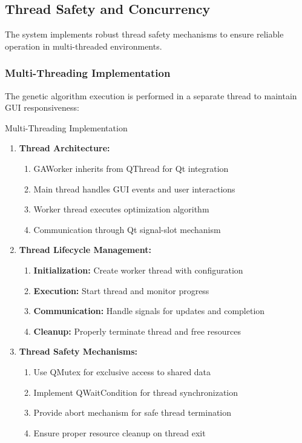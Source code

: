 \documentclass[12pt,a4paper]{article}
\begin{document}
\subsection{Thread Safety and Concurrency}

The system implements robust thread safety mechanisms to ensure reliable operation in multi-threaded environments.

\subsubsection{Multi-Threading Implementation}

The genetic algorithm execution is performed in a separate thread to maintain GUI responsiveness:

\begin{algorithm}
\caption{Multi-Threading Implementation}
\begin{enumerate}
    \item \textbf{Thread Architecture:}
    \begin{enumerate}
        \item GAWorker inherits from QThread for Qt integration
        \item Main thread handles GUI events and user interactions
        \item Worker thread executes optimization algorithm
        \item Communication through Qt signal-slot mechanism
    \end{enumerate}
    \item \textbf{Thread Lifecycle Management:}
    \begin{enumerate}
        \item \textbf{Initialization:} Create worker thread with configuration
        \item \textbf{Execution:} Start thread and monitor progress
        \item \textbf{Communication:} Handle signals for updates and completion
        \item \textbf{Cleanup:} Properly terminate thread and free resources
    \end{enumerate}
    \item \textbf{Thread Safety Mechanisms:}
    \begin{enumerate}
        \item Use QMutex for exclusive access to shared data
        \item Implement QWaitCondition for thread synchronization
        \item Provide abort mechanism for safe thread termination
        \item Ensure proper resource cleanup on thread exit
    \end{enumerate}
\end{enumerate}
\end{algorithm}
\end{document}

